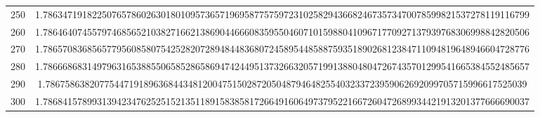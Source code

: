 \documentclass[final]{article}
\begin{document}
\begin{table}
\begin{center}
\begin{tabular}{|c|c|}
250 &   1.786347191822507657860263018010957365719695877575972310258294366824673573470078599821537278119116799   \\
260 &   1.786464074557974685652103827166213869044666083595504607101598804109671770927137939768306998842820506   \\
270 &   1.786570836856577956085807542528207289484483680724589544858875935189026812384711094819648946604728776   \\
280 &   1.786668683149796316538855065852865869474244951373266320571991388048047267435701299541665384552485657   \\
290 &   1.78675863820775447191896368443481200475150287205048794648255403233723959062692099705715996617525039    \\
300 &   1.786841578993139423476252515213511891583858172664916064973795221667260472689934421913201377666690037   \\
\hline
\hline
\end{tabular}
\end{center}
\bigskip\bigskip
\end{table}
\end{document}
